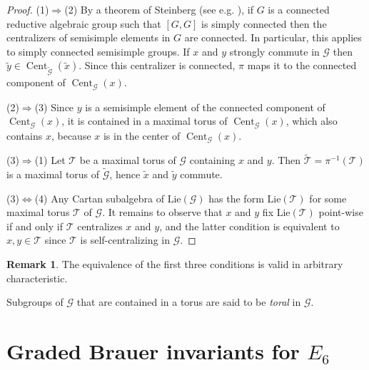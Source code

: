 \documentclass[a4paper,reqno]{amsart}
\theoremstyle{definition}
\newtheorem{remark}[theorem]{Remark}
\numberwithin{theorem}{section}
\numberwithin{equation}{section}
\begin{document}
\begin{proof}
(1)$\Rightarrow$(2) By a theorem of Steinberg (see e.g. \cite[Th. 3.5.6]{Carter}), if $G$ is a connected reductive algebraic group such that $[G,G]$ is simply connected then the centralizers of semisimple elements in $G$ are connected. In particular, this applies to simply connected semisimple groups. If $x$ and $y$ strongly commute in ${\mathcal{G}}$ then $\tilde{y}\in\operatorname{\mathrm{Cent}}_{\tilde{\mathcal{G}}}(\tilde{x})$. Since this centralizer is connected, $\pi$ maps it to the connected component of $\operatorname{\mathrm{Cent}}_{\mathcal{G}}(x)$.

(2)$\Rightarrow$(3) Since $y$ is a semisimple element of the connected component of $\operatorname{\mathrm{Cent}}_{\mathcal{G}}(x)$, it is contained in a maximal torus of $\operatorname{\mathrm{Cent}}_{\mathcal{G}}(x)$, which also contains $x$, because $x$ is in the center of $\operatorname{\mathrm{Cent}}_{\mathcal{G}}(x)$.

(3)$\Rightarrow$(1) Let ${\mathcal{T}}$ be a maximal torus of ${\mathcal{G}}$ containing $x$ and $y$. Then $\tilde{\mathcal{T}}=\pi^{-1}({\mathcal{T}})$ is a maximal torus of $\tilde{\mathcal{G}}$, hence $\tilde{x}$ and $\tilde{y}$ commute.

(3)$\Leftrightarrow$(4) Any Cartan subalgebra of ${\mathrm{Lie}}({\mathcal{G}})$ has the form ${\mathrm{Lie}}({\mathcal{T}})$ for some maximal torus ${\mathcal{T}}$ of ${\mathcal{G}}$. It remains to observe that $x$ and $y$ fix ${\mathrm{Lie}}({\mathcal{T}})$ point-wise if and only if ${\mathcal{T}}$ centralizes $x$ and $y$, and the latter condition is equivalent to $x,y\in{\mathcal{T}}$ since ${\mathcal{T}}$ is self-centralizing in ${\mathcal{G}}$.
\end{proof}

\begin{remark}
The equivalence of the first three conditions is valid in arbitrary characteristic.
\end{remark}

Subgroups of ${\mathcal{G}}$ that are contained in a torus are said to be \emph{toral} in ${\mathcal{G}}$.

\section{Graded Brauer invariants for $E_6$}\label{se:E6}
\end{document}
